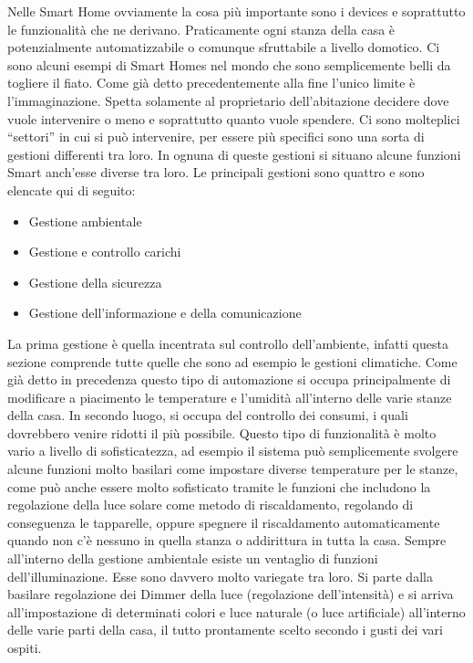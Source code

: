 Nelle Smart Home ovviamente la cosa più importante sono i devices e soprattutto le funzionalità che ne derivano. Praticamente ogni stanza della casa è potenzialmente automatizzabile o comunque sfruttabile a livello domotico.
Ci sono alcuni esempi di Smart Homes nel mondo che sono semplicemente belli da togliere il fiato. Come già detto precedentemente alla fine l’unico limite è l’immaginazione. Spetta solamente al proprietario dell’abitazione decidere dove vuole intervenire o meno e soprattutto quanto vuole spendere.
Ci sono molteplici “settori” in cui si può intervenire, per essere più specifici sono una sorta di gestioni differenti tra loro. In ognuna di queste gestioni si situano alcune funzioni Smart anch’esse diverse tra loro. 
Le principali gestioni  sono quattro e sono elencate qui di seguito:
\begin{itemize}
    \item{Gestione ambientale}
    \item{Gestione e controllo carichi}
    \item{Gestione della sicurezza}
    \item{Gestione dell’informazione e della comunicazione}
\end{itemize}
La prima gestione è quella incentrata sul controllo dell’ambiente, infatti questa sezione comprende tutte quelle che sono ad esempio le gestioni climatiche. Come già detto in precedenza questo tipo di automazione si occupa principalmente di modificare a piacimento le temperature e l’umidità all’interno delle varie stanze della casa. In secondo luogo, si occupa del controllo dei consumi, i quali dovrebbero venire ridotti il più possibile. Questo tipo di funzionalità è molto vario a livello di sofisticatezza, ad esempio il sistema può semplicemente svolgere alcune funzioni molto basilari come impostare diverse temperature per le stanze, come può anche essere molto sofisticato tramite le funzioni che includono la regolazione della luce solare come metodo di riscaldamento, regolando di conseguenza le tapparelle, oppure spegnere il riscaldamento automaticamente quando non c’è nessuno in quella stanza o addirittura in tutta la casa. 
Sempre all’interno della gestione ambientale esiste un ventaglio di funzioni dell’illuminazione. Esse sono davvero molto variegate tra loro. Si parte dalla basilare regolazione dei Dimmer della luce (regolazione dell’intensità) e si arriva all’impostazione di determinati colori e luce naturale (o luce artificiale) all’interno delle varie parti della casa, il tutto prontamente scelto secondo i gusti dei vari ospiti. 
